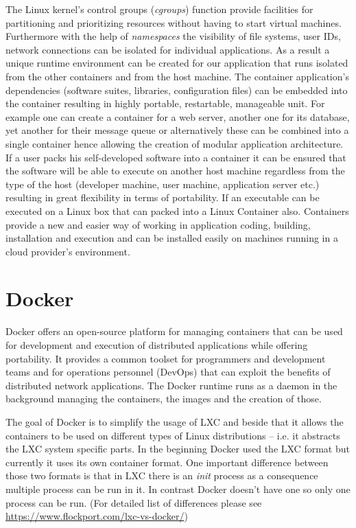 \documentclass[a4paper]{article}
\begin{document}
The Linux kernel's control groups (\emph{cgroups}) function provide facilities for partitioning and prioritizing resources without having to
start virtual machines. Furthermore with the help of \emph{namespaces} the visibility of file systems, user IDs, network connections can be
isolated for individual applications. As a result a unique runtime environment can be created for our application that runs isolated from
the other containers and from the host machine.
The container application's dependencies (software suites, libraries, configuration files) can be embedded into the container resulting in
highly portable, restartable, manageable unit.
For example one can create a container for a web server, another one for its database, yet another for their message queue or alternatively these
can be combined into a single container hence allowing the creation of modular application architecture.
If a user packs his self-developed software into a container it can be ensured that the software will be able to execute on another host machine regardless from the type of the host (developer machine, user machine, application server etc.) resulting in great flexibility in terms of portability.
If an executable can be executed on a Linux box that can packed into a Linux Container also. Containers provide a new and easier way of working in application coding, building, installation and execution and can be installed easily on machines running in a cloud provider's environment.

\section{Docker}

Docker offers an open-source platform for managing containers that can be used for development and execution of distributed applications
while offering portability.
It provides a common toolset for programmers and development teams and for operations personnel (DevOps) that can exploit the benefits
of distributed network applications.
The Docker runtime runs as a daemon in the background managing the containers, the images and the creation of those.

The goal of Docker is to simplify the usage of LXC and beside that it allows the containers to be used on different types of Linux
distributions -- i.e. it abstracts the LXC system specific parts. In the beginning Docker used the LXC format but currently it uses its own
container format. One important difference between those two formats is that in LXC there is an \emph{init} process as a consequence multiple 
process can be run in it. In contrast Docker doesn't have one so only one process can be run. (For detailed list of differences please see \url{https://www.flockport.com/lxc-vs-docker/})
\end{document}
